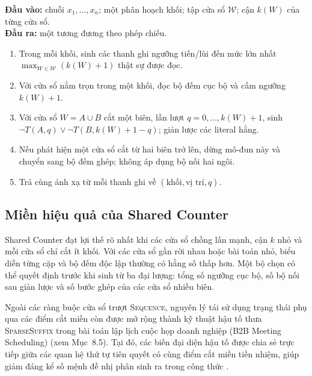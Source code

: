 \begin{algorithm}[H]
\caption{Sinh AMK cửa sổ chia sẻ khi mỗi cửa sổ cắt nhiều nhất một biên}
\label{alg:shared-window}
\begin{minipage}{.94\textwidth}\small
\textbf{Đầu vào:} chuỗi \(x_1,\ldots,x_n\); một phân hoạch khối; tập cửa sổ
\(\mathcal W\); cận \(k(W)\) của từng cửa sổ.\\
\textbf{Đầu ra:} một \CNF tương đương theo phép chiếu.
\begin{enumerate}
  \item Trong mỗi khối, sinh các thanh ghi ngưỡng tiến/lùi đến mức lớn
  nhất \(\max_{W\in\mathcal W}(k(W)+1)\) thật sự được đọc.
  \item Với cửa sổ nằm trọn trong một khối, đọc bộ đếm cục bộ và cấm
  ngưỡng \(k(W)+1\).
  \item Với cửa sổ \(W=A\cup B\) cắt một biên, lần lượt
  \(q=0,\ldots,k(W)+1\), sinh
  \(\neg T(A,q)\lor\neg T(B,k(W)+1-q)\); giản lược các literal hằng.
  \item Nếu phát hiện một cửa sổ cắt từ hai biên trở lên, dừng mô-đun này
  và chuyển sang bộ đếm ghép; không áp dụng bộ nối hai ngôi.
  \item Trả \CNF cùng ánh xạ từ mỗi thanh ghi về
        \((\text{khối},\text{vị trí},q)\).
\end{enumerate}
\end{minipage}
\end{algorithm}

\subsection{Miền hiệu quả của Shared Counter}

Shared Counter đạt lợi thế rõ nhất khi các cửa sổ chồng lấn mạnh, cận \(k\)
nhỏ và mỗi cửa sổ chỉ cắt ít khối. Với các cửa sổ gần rời nhau hoặc bài toán
nhỏ, biểu diễn từng cặp và bộ đếm độc lập thường có hằng số thấp hơn. Một bộ chọn
có thể quyết định trước khi sinh \CNF từ ba đại lượng: tổng số ngưỡng cục bộ,
số bộ nối sau giản lược và số bước ghép của các cửa sổ nhiều biên.

Ngoài các ràng buộc cửa sổ trượt \textsc{Sequence}, nguyên lý tái sử dụng trạng thái phụ qua các điểm cắt miền còn được mở rộng thành kỹ thuật hậu tố thưa \mbox{\textnormal{\textsc{SparseSuffix}}} trong bài toán lập lịch cuộc họp doanh nghiệp (B2B Meeting Scheduling) \parencite{nguyen2026compactsatmaxsatencodings} (xem Mục~8.5). Tại đó, các biến đại diện hậu tố được chia sẻ trực tiếp giữa các quan hệ thứ tự tiên quyết có cùng điểm cắt miền tiền nhiệm, giúp giảm đáng kể số mệnh đề nhị phân sinh ra trong công thức \CNF.


